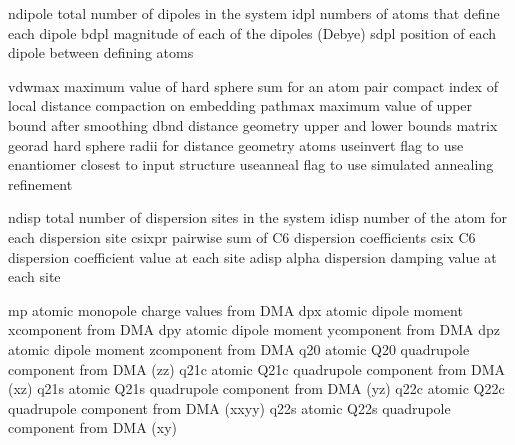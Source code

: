 \documentclass[letterpaper,11pt,english]{sphinxmanual}
\begin{document}

\begin{sphinxVerbatim}[commandchars=\\\{\}]
ndipole         total number of dipoles in the system
idpl            numbers of atoms that define each dipole
bdpl            magnitude of each of the dipoles (Debye)
sdpl            position of each dipole between defining atoms
\end{sphinxVerbatim}


\begin{sphinxVerbatim}[commandchars=\\\{\}]
vdwmax          maximum value of hard sphere sum for an atom pair
compact         index of local distance compaction on embedding
pathmax         maximum value of upper bound after smoothing
dbnd            distance geometry upper and lower bounds matrix
georad          hard sphere radii for distance geometry atoms
use\PYGZus{}invert      flag to use enantiomer closest to input structure
use\PYGZus{}anneal      flag to use simulated annealing refinement
\end{sphinxVerbatim}


\begin{sphinxVerbatim}[commandchars=\\\{\}]
ndisp           total number of dispersion sites in the system
idisp           number of the atom for each dispersion site
csixpr          pairwise sum of C6 dispersion coefficients
csix            C6 dispersion coefficient value at each site
adisp           alpha dispersion damping value at each site
\end{sphinxVerbatim}


\begin{sphinxVerbatim}[commandchars=\\\{\}]
mp              atomic monopole charge values from DMA
dpx             atomic dipole moment x\PYGZhy{}component from DMA
dpy             atomic dipole moment y\PYGZhy{}component from DMA
dpz             atomic dipole moment z\PYGZhy{}component from DMA
q20             atomic Q20 quadrupole component from DMA (zz)
q21c            atomic Q21c quadrupole component from DMA (xz)
q21s            atomic Q21s quadrupole component from DMA (yz)
q22c            atomic Q22c quadrupole component from DMA (xx\PYGZhy{}yy)
q22s            atomic Q22s quadrupole component from DMA (xy)
\end{sphinxVerbatim}
\end{document}
